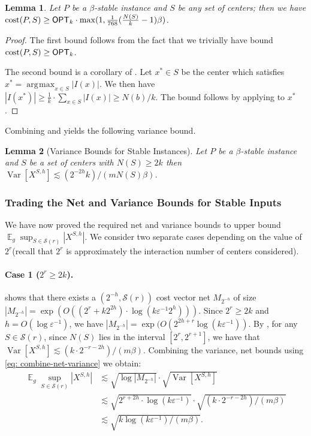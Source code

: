\documentclass[11pt]{article}
\DeclareMathOperator*{\argmax}{\arg\!\max}
\newtheorem{lemma}{Lemma}[section]
\theoremstyle{restate}
\theoremstyle{definition}
\newcommand{\eps}{\ensuremath{\varepsilon}}
\DeclareMathOperator*{\var}{\mathrm{Var}}
\newcommand{\E}{\mathop{\mathbb{E}}}
\newcommand{\cost}{\textnormal{cost}}
\newcommand{\opt}{\ensuremath{\mathsf{OPT}}}
\newcommand{\ccint}{N} %
\begin{document}
\begin{lemma}\label{lem: cost-increase-2}
	Let $P$ be a $\beta$-stable instance and $S$ be any set of centers; then we have $\cost(P,S) \geq \opt_k \cdot \max(1,  \tfrac{1}{768} (\tfrac{\ccint(S)}{k} - 1) \beta)$. 
\end{lemma}
\begin{proof}
	 The first bound follows from the fact that we trivially have bound $\cost(P,S) \geq \opt_k$. 
  
  The second bound is a corollary of . Let $x^* \in S$ be the center which satisfies  $x^* = \argmax_{x \in S} |I(x)|$. We then have $|I(x^*)| \geq \tfrac{1}{k} \cdot \sum_{x \in S} |I(x)| \geq N(b)/k $. The bound follows by applying   to $x^*$.\qedhere
\end{proof}

Combining  and   yields the following variance bound.


\begin{lemma}[Variance Bounds for Stable Instances]\label{lem: stable-var} Let $P$ be a $\beta$-stable instance and $S$ be a set of centers with $N(S) \geq 2k$ then $\var[X^{S,h}] \lesssim (2^{-2h} k)/(m N(S) \beta)$.
\end{lemma}

\subsubsection{Trading the Net and Variance Bounds for Stable Inputs}\label{sec: trading-net-variance-stable}
We have now proved the required net and variance bounds to upper bound $ \E_g \sup_{S \in \mathcal{S}(r)} |X^{S,h}|$. We consider two separate cases depending on the value of $2^r$(recall that $2^r$ is approximately the interaction number of centers considered). 

\paragraph{Case 1 ($2^r \geq 2k$).}  shows that there exists a $(2^{-h}, \mathcal{S}(r))$ cost vector net $M_{2^{-h}}$ of size $|M_{2^{-h}}| = \exp(O\left((2^r + k 2^{2h})\cdot \log(k \eps^{-1}2^{h})\right))$. Since $2^r \geq 2k$ and $h = O(\log \eps^{-1})$, we have $|M_{2^{-h}}| = \exp(O(2^{2h+r} \log(k \eps^{-1} ))$. By ,  for any $S \in \mathcal{S}(r)$, since $N(S)$ lies in the interval $[2^r, 2^{r+1}]$, we have that $\var[X^{S,h}] \lesssim (k \cdot 2^{-r-2h}  )/ (m \beta)$. Combining the variance, net bounds using  \eqref{eq: combine-net-variance} we obtain: 
\begin{align*}
\E_g \sup_{S \in \mathcal{S}(r)} |X^{S,h}| &\lesssim \sqrt{\log |M_{2^{-h}}|} \cdot \sqrt{\var[X^{S,h}]}\\
&\lesssim \sqrt{  2^{r+2h} \cdot\log(k \eps^{-1})} \cdot \sqrt{(k \cdot 2^{-r-2h} )/(m  \beta)}\\
&\lesssim \sqrt{k\log(k \eps^{-1})/(m \beta)}.
\end{align*}
\end{document}
